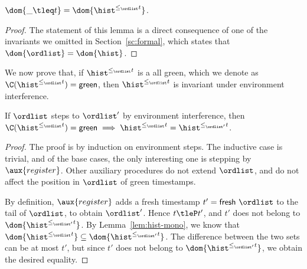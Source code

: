\begin{lemma}\label{lem:chaintleq-dom}
  $ \dom{ \_ \tleq t} = \dom{\chaintleq{t}{\ordlist}}$.
\end{lemma}

\begin{proof}
The statement of this lemma is a direct consequence of one of the
invariants we omitted in Section~\ref{sc:formal}, which states that $
\dom{\ordlist} = \dom{\hist}$.
\end{proof}

We now prove that, if $\chaintleq{t}{\ordlist}$ is a {\sf all green},
which we denote as $\C(\chaintleq{t}{\ordlist}) = {\sf green}$, then
$\chaintleq{t}{\ordlist}$ is invariant under environment interference.


\begin{lemma}%
\label{lem:green-stable}%
If $\ordlist$ steps to $\ordlist'$ by environment interference, then
$\C(\chaintleq{t}{\ordlist}) = {\sf green} \implies
\chaintleq{t}{\ordlist} = \chaintleq{t}{\ordlist'}$.
\end{lemma}
%
\begin{proof}
The proof is by induction on environment steps. The inductive case is
trivial, and of the base cases, the only interesting one is stepping
by $\aux{register}$. Other auxiliary procedures do not extend
$\ordlist$, and do not affect the position in $\ordlist$ of green
timestamps.

By definition, $\aux{register}$ adds a fresh timestamp $t' =
\mathsf{fresh}\ \ordlist$ to the tail of $\ordlist$, to obtain
$\ordlist'$. Hence $t \tleP t'$, and $t'$ does not belong to
$\dom{\chaintleq{t}{\ordlist'}}$. By Lemma~\ref{lem:hist-mono}, we
know that $\dom{\chaintleq{t}{\ordlist}} \subseteq
\dom{\chaintleq{t}{\ordlist'}}$. The difference between the two sets
can be at most $t'$, but since $t'$ does not belong to
$\dom{\chaintleq{t}{\ordlist'}}$, we obtain the desired equality.
\end{proof}



